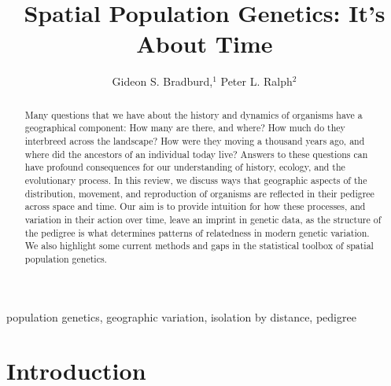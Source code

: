 \documentclass{ar-1col}
\begin{document}

\title{Spatial Population Genetics: It's About Time}


\author{Gideon S. Bradburd,$^1$ Peter L. Ralph$^2$
}

\begin{abstract}
    Many questions that we have about the history and dynamics of organisms
    have a geographical component:
    How many are there, and where?
    How much do they interbreed across the landscape?
    How were they moving a thousand years ago,
    and where did the ancestors of an individual today live?
    Answers to these questions can have profound consequences
    for our understanding of history, ecology, and the evolutionary process.
    In this review, we discuss ways that geographic aspects of the 
    distribution, movement, and reproduction of organisms
    are reflected in their pedigree across space and time.
    Our aim is to provide intuition for how these processes,
    and variation in their action over time,  
    leave an imprint in genetic data,
    as the structure of the pedigree is what determines 
    patterns of relatedness in modern genetic variation.
    We also highlight some current methods and gaps 
    in the statistical toolbox of spatial population genetics.
\end{abstract}

\begin{keywords}
population genetics, geographic variation, isolation by distance, pedigree
\end{keywords}
\maketitle

\tableofcontents

\section{Introduction}
\end{document}
